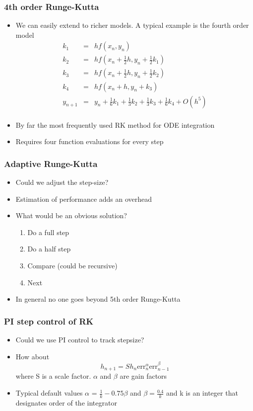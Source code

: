 \documentclass[10pt]{beamer}
\begin{document}
\begin{frame}
  \frametitle{4th order Runge-Kutta}
  \begin{itemize}
  \item We can easily extend to richer models. A typical example is the fourth order model
    \[
      \begin{array}{rcl}
        k_1 & = & h f( x_n, y_n)\\
        k_2 & = & h f( x_n + \frac{1}{2} h, y_n + \frac{1}{2} k_1)\\ 
        k_3 & = & h f( x_n + \frac{1}{2} h, y_n + \frac{1}{2} k_2)\\
        k_4 & = & h f( x_n + h, y_n + k_3)\\
        y_{n+1} & = & y_n + \frac{1}{6} k_1 + \frac{1}{3} k_2 + \frac{1}{3} k_3 + \frac{1}{6} k_4 + O(h^5)\\        
      \end{array}
    \]
  \item By far the most frequently used RK method for ODE integration
  \item Requires four function evaluations for every step
  \end{itemize}
\end{frame}

\begin{frame}
  \frametitle{Adaptive Runge-Kutta}
  \begin{itemize}
  \item Could we adjust the step-size? 
  \item Estimation of performance adds an overhead
  \item What would be an obvious solution? \pause
    \begin{enumerate}
    \item Do a full step
    \item Do a half step
    \item Compare (could be recursive)
    \item Next
    \end{enumerate}
  \item In general no one goes beyond 5th order Runge-Kutta
  \end{itemize}
\end{frame}

\begin{frame}
  \frametitle{PI step control of RK}
  \begin{itemize}
  \item Could we use PI control to track stepsize? \pause
  \item How about
    \[
      h_{n+1} = S h_n \mbox{err}_n^{\alpha} \mbox{err}_{n-1}^{\beta}
    \]
    where S is a scale factor. $\alpha$ and $\beta$ are gain factors
  \item Typical default values $\alpha$ = $\frac{1}{k} - 0.75 \beta$
    and $\beta = \frac{0.4}{k}$ and k is an integer that designates
    order of the integrator
  \end{itemize}
\end{frame}
\end{document}
